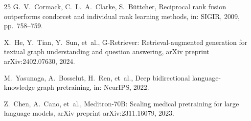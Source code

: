 \documentclass[review]{elsarticle}
\begin{document}
\begin{thebibliography}{25}
G.~V.~Cormack, C.~L.~A.~Clarke, S.~B\"uttcher, Reciprocal rank fusion outperforms condorcet and individual rank learning methods, in: SIGIR, 2009, pp.~758--759.

X.~He, Y.~Tian, Y.~Sun, et~al., G-Retriever: Retrieval-augmented generation for textual graph understanding and question answering, arXiv preprint arXiv:2402.07630, 2024.

M.~Yasunaga, A.~Bosselut, H.~Ren, et~al., Deep bidirectional language-knowledge graph pretraining, in: NeurIPS, 2022.

Z.~Chen, A.~Cano, et~al., Meditron-70B: Scaling medical pretraining for large language models, arXiv preprint arXiv:2311.16079, 2023.

\end{thebibliography}
\end{document}
